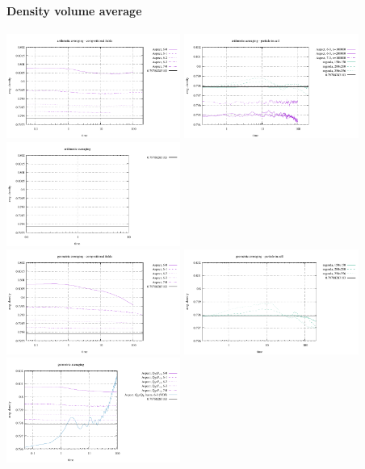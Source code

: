 \paragraph{Density volume average}
\begin{center}
\includegraphics[width=5.7cm]{images/stokes_sphere_fs2D/avrg_density_arithm_comp}
\includegraphics[width=5.7cm]{images/stokes_sphere_fs2D/avrg_density_arithm_pic}
\includegraphics[width=5.7cm]{images/stokes_sphere_fs2D/avrg_density_arithm_add}\\
\includegraphics[width=5.7cm]{images/stokes_sphere_fs2D/avrg_density_geom_comp}
\includegraphics[width=5.7cm]{images/stokes_sphere_fs2D/avrg_density_geom_pic}
\includegraphics[width=5.7cm]{images/stokes_sphere_fs2D/avrg_density_geom_add}\\

\end{center}
